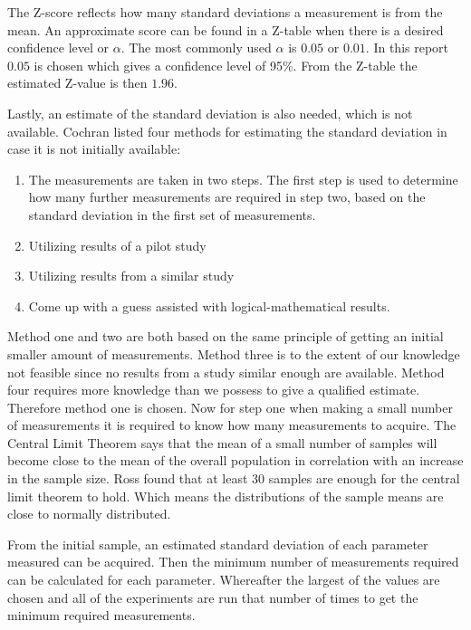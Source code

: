 The Z-score reflects how many standard deviations a measurement is from the mean. An approximate score can be found in a Z-table when there is a desired confidence level or $\alpha$. The most commonly used $\alpha$ is $0.05$ or $0.01$.\cite{kotrlik2001organizational} In this report $0.05$ is chosen which gives a confidence level of 95\%. From the Z-table the estimated Z-value is then $1.96$. 

Lastly, an estimate of the standard deviation is also needed, which is not available. Cochran listed four methods for estimating the standard deviation in case it is not initially available:
\begin{enumerate}
    \item The measurements are taken in two steps. The first step is used to determine how many further measurements are required in step two, based on the standard deviation in the first set of measurements.
    \item Utilizing results of a pilot study
    \item Utilizing results from a similar study
    \item Come up with a guess assisted with logical-mathematical results.
\end{enumerate}


Method one and two are both based on the same principle of getting an initial smaller amount of measurements. Method three is to the extent of our knowledge not feasible since no results from a study similar enough are available. Method four requires more knowledge than we possess to give a qualified estimate. Therefore method one is chosen. Now for step one when making a small number of measurements it is required to know how many measurements to acquire. The Central Limit Theorem says that the mean of a small number of samples will become close to the mean of the overall population in correlation with an increase in the sample size. Ross found that at least 30 samples are enough for the central limit theorem to hold\cite{Ross}. Which means the distributions of the sample means are close to normally distributed.


From the initial sample, an estimated standard deviation of each parameter measured can be acquired. Then the minimum number of measurements required can be calculated for each parameter. Whereafter the largest of the values are chosen and all of the experiments are run that number of times to get the minimum required measurements.



